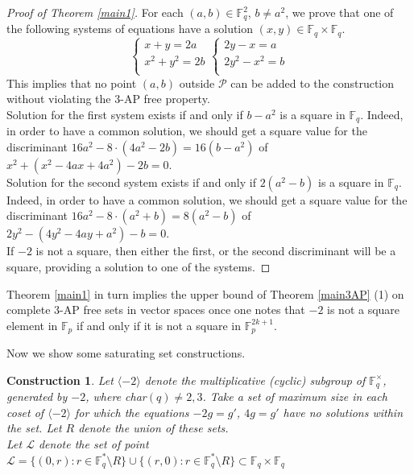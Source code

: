 \documentclass[11pt]{article}
\numberwithin{table}{section}
\newcommand{\cP}{{\mathcal P}}
\newcommand{\cL}{{\mathcal L}}
\newcommand{\F}{{\mathbb F}}
\newtheorem{constr}[theorem]{\bf Construction}
\theoremstyle{definition}
\begin{document}
	\begin{proof}[Proof of Theorem \ref{main1}]
		For each $(a,b)\in \F_q^2$, $b\neq a^2$, we prove that one of the following systems of equations have a solution $(x,y)\in \F_q\times \F_q$. 
		\begin{equation*}   
			\begin{cases}
				x+y=2a \\
				x^2+y^2=2b\\
			\end{cases}
			\begin{cases}
				2y-x=a \\
				2y^2-x^2=b\\
			\end{cases}
		\end{equation*}
		This implies that no point $(a,b)$ outside $\cP$ can be added to the construction without violating the  $3$-$\mathrm{AP}$ free property.\\
		Solution for the first system exists if and only if $b-a^2$ is a square in $\F_q$. Indeed, in order to have a common solution, we should get a square value for the discriminant $16a^2-8\cdot(4a^2-2b)=16(b-a^2)$ of  $x^2+(x^2-4ax+4a^2)-2b=0$.\\
		Solution for the second system exists if and only if $2(a^2-b)$ is a square in $\F_q$. Indeed, in order to have a common solution, we should get a square value for the discriminant $16a^2-8\cdot(a^2+b)=8(a^2-b)$ of  $2y^2-(4y^2-4ay+a^2)-b=0$.\\
		If $-2$ is not a square, then either the first, or the second discriminant will be a square, providing a solution to one of the systems.
	\end{proof}
	
	Theorem \ref{main1} in turn implies the upper bound of Theorem \ref{main3AP} (1) on complete $3$-AP free sets in vector spaces once one notes that $-2$ is not a square element in $\mathbb{F}_p$ if and only if it is not a square in $\mathbb{F}_p^{2k+1}$.
	
	Now we show some saturating set constructions.
	
	\begin{constr}
		\label{lines} Let $\langle -2 \rangle$ denote the multiplicative (cyclic) subgroup of $\F_q^\times$, generated by $-2$, where char$(q)\neq 2,3$. Take a set of maximum size in each coset of $\langle -2 \rangle$ for which the equations $-2g=g'$, $4g=g'$ have no solutions within the set. Let $R$ denote the union of these sets.\\
		Let $\cL$ denote the set of point $\cL=\{(0,r) :  r\in \F_q^* \setminus R  \}\cup\{(r,0): r\in \F_q^* \setminus R  \}\subset \F_q \times \F_q$ 
	\end{constr}
	
\end{document}
